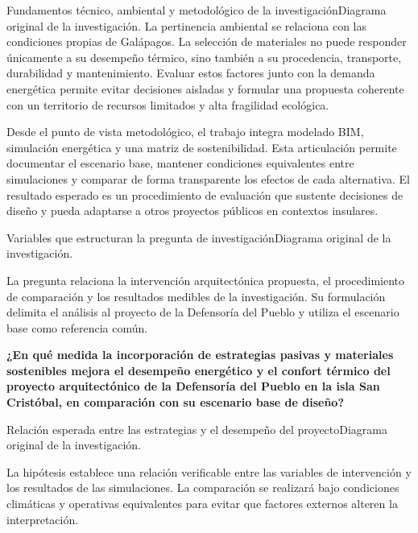 \begin{landscape}
\begin{pilotoTextoGrafico}{\graficoJustificacionIntro}{Fundamentos técnico, ambiental y metodológico de la investigación}{Diagrama original de la investigación.}
La pertinencia ambiental se relaciona con las condiciones propias de Galápagos. La selección de materiales no puede responder únicamente a su desempeño térmico, sino también a su procedencia, transporte, durabilidad y mantenimiento. Evaluar estos factores junto con la demanda energética permite evitar decisiones aisladas y formular una propuesta coherente con un territorio de recursos limitados y alta fragilidad ecológica.

Desde el punto de vista metodológico, el trabajo integra modelado BIM, simulación energética y una matriz de sostenibilidad. Esta articulación permite documentar el escenario base, mantener condiciones equivalentes entre simulaciones y comparar de forma transparente los efectos de cada alternativa. El resultado esperado es un procedimiento de evaluación que sustente decisiones de diseño y pueda adaptarse a otros proyectos públicos en contextos insulares.
\end{pilotoTextoGrafico}


\begin{pilotoTextoGrafico}{\graficoPreguntaIntro}{Variables que estructuran la pregunta de investigación}{Diagrama original de la investigación.}

La pregunta relaciona la intervención arquitectónica propuesta, el procedimiento de comparación y los resultados medibles de la investigación. Su formulación delimita el análisis al proyecto de la Defensoría del Pueblo y utiliza el escenario base como referencia común.

\textbf{¿En qué medida la incorporación de estrategias pasivas y materiales sostenibles mejora el desempeño energético y el confort térmico del proyecto arquitectónico de la Defensoría del Pueblo en la isla San Cristóbal, en comparación con su escenario base de diseño?}
\end{pilotoTextoGrafico}


\begin{pilotoTextoGrafico}{\graficoHipotesisIntro}{Relación esperada entre las estrategias y el desempeño del proyecto}{Diagrama original de la investigación.}

La hipótesis establece una relación verificable entre las variables de intervención y los resultados de las simulaciones. La comparación se realizará bajo condiciones climáticas y operativas equivalentes para evitar que factores externos alteren la interpretación.


\end{pilotoTextoGrafico}
\end{landscape}
